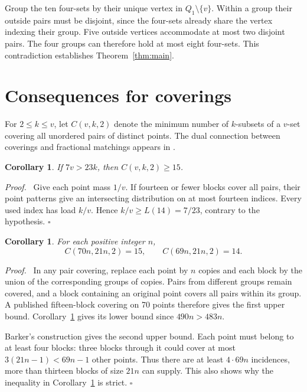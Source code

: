 \documentclass[11pt]{article}
\newtheorem{corollary}[theorem]{Corollary}
\newenvironment{proof}{\par\noindent\textit{Proof.}\ }{\hfill\(\square\)\par}
\begin{document}
Group the ten four-sets by their unique vertex in \(Q_1\setminus\{v\}\).
Within a group their outside pairs must be disjoint, since the four-sets
already share the vertex indexing their group. Five outside vertices
accommodate at most two disjoint pairs. The four groups can therefore
hold at most eight four-sets. This contradiction establishes
Theorem~\ref{thm:main}.

\section{Consequences for coverings}
For \(2\le k\le v\), let \(C(v,k,2)\) denote the minimum number of
\(k\)-subsets of a \(v\)-set covering all unordered pairs of distinct
points. The dual connection between coverings and fractional matchings
appears in \cite[Proposition (3.2) and inequality (3.3)]{furedi90}.
\begin{corollary}\label{cor:threshold}
If \(7v>23k\), then \(C(v,k,2)\ge15\).
\end{corollary}
\begin{proof}
Give each point mass \(1/v\). If fourteen or fewer blocks cover all
pairs, their point patterns give an intersecting distribution on at
most fourteen indices. Every used index has load \(k/v\). Hence
\(k/v\ge L(14)=7/23\), contrary to the hypothesis.
\end{proof}

\begin{corollary}\label{cor:families}
For each positive integer \(n\),
\[
 C(70n,21n,2)=15,\qquad C(69n,21n,2)=14 .
\]
\end{corollary}
\begin{proof}
In any pair covering, replace each point by \(n\) copies and each
block by the union of the corresponding groups of copies. Pairs from
different groups remain covered, and a block containing an original
point covers all pairs within its group. A published fifteen-block
covering on 70 points \cite{irsi,meliwat,canli} therefore gives the
first upper bound. Corollary~\ref{cor:threshold} gives its lower bound
since \(490n>483n\).

Barker's construction gives the second upper bound. Each point must
belong to at least four blocks: three blocks through it could cover
at most \(3(21n-1)<69n-1\) other points. Thus there are at least
\(4\cdot69n\) incidences, more than thirteen blocks of size \(21n\)
can supply. This also shows why the inequality in
Corollary~\ref{cor:threshold} is strict.
\end{proof}
\end{document}
